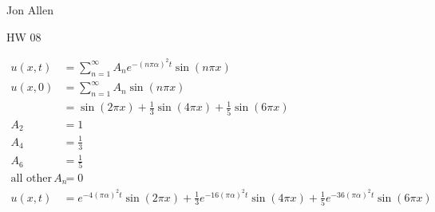 \documentclass{article}
\begin{document}
Jon Allen

HW 08

\begin{align*}
  u(x,t)&=\sum\limits_{n=1}^\infty{A_ne^{-(n\pi\alpha)^2t}\sin(n\pi x)}\\
  u(x,0)&=\sum\limits_{n=1}^\infty{A_n\sin(n\pi x)}\\
  &=\sin(2\pi x)+\frac{1}{3}\sin(4\pi x)+\frac{1}{5}\sin(6\pi x)\\
  A_2&=1\\
  A_4&=\frac{1}{3}\\
  A_6&=\frac{1}{5}\\
  \text{all other }A_n&=0\\
  u(x,t)&=e^{-4(\pi\alpha)^2t}\sin(2\pi x)+\frac{1}{3}e^{-16(\pi\alpha)^2t}\sin(4\pi x)+\frac{1}{5}e^{-36(\pi\alpha)^2t}\sin(6\pi x)
\end{align*}
\end{document}
